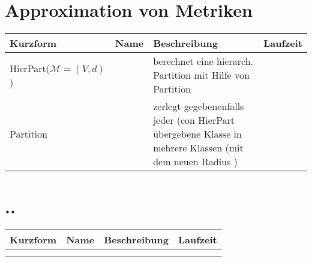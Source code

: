 \section{Approximation von Metriken}
\begin{tabularx}{\textwidth}{|l|X|X|X|} \hline
Kurzform & Name & Beschreibung & Laufzeit\\ \hline \hline
 HierPart($\mathcal{M} = (V, d)$) &  & berechnet eine hierarch. Partition mit Hilfe von Partition &  \\ \hline
 Partition &  & zerlegt gegebenenfalls jeder (con HierPart übergebene Klasse in mehrere Klassen (mit dem neuen Radius )&  \\ \hline
\end{tabularx}




\section{..}
\begin{tabularx}{\textwidth}{|l|X|X|X|} \hline
Kurzform & Name & Beschreibung & Laufzeit\\ \hline \hline
  &  &  &  \\ \hline
  &  &  &  \\ \hline
\end{tabularx}